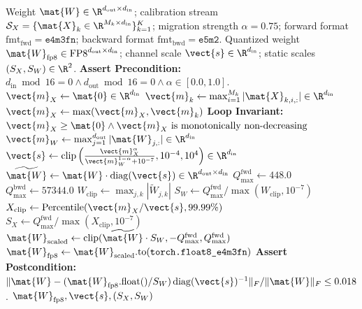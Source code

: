 \begin{algorithm}[H]
\caption[Outlier-Isolated Channel-Scaled FP8 Mixed-Precision Quantization]{Outlier-Isolated Channel-Scaled FP8 Mixed-Precision Quantization}
\label{alg:fp8_mixed_precision_quant}
\begin{algorithmic}[1]
\REQUIRE Weight $\mat{W} \in \R^{d_{\text{out}} \times d_{\text{in}}}$; calibration stream $\mathcal{S}_X = \{\mat{X}_k \in \R^{M_k \times d_{\text{in}}}\}_{k=1}^K$; migration strength $\alpha = 0.75$; forward format $\text{fmt}_{\text{fwd}} = \texttt{e4m3fn}$; backward format $\text{fmt}_{\text{bwd}} = \texttt{e5m2}$.
\ENSURE Quantized weight $\mat{W}_{\text{fp8}} \in \text{FP8}^{d_{\text{out}} \times d_{\text{in}}}$; channel scale $\vect{s} \in \R^{d_{\text{in}}}$; static scales $(S_X, S_W) \in \R^2$.
\STATE \textbf{Assert Precondition:} $d_{\text{in}} \bmod 16 = 0 \land d_{\text{out}} \bmod 16 = 0 \land \alpha \in [0.0, 1.0]$.
\STATE {}
\STATE $\vect{m}_X \leftarrow \mat{0} \in \R^{d_{\text{in}}}$
    \STATE $\vect{m}_k \leftarrow \max_{i=1}^{M_k} |\mat{X}_{k, i, :}| \in \R^{d_{\text{in}}}$ 
    \STATE $\vect{m}_X \leftarrow \max(\vect{m}_X, \vect{m}_k)$
    \STATE \textbf{Loop Invariant:} $\vect{m}_X \ge \mat{0} \land \vect{m}_X \text{ is monotonically non-decreasing}$
\ENDFOR
\STATE {}
\STATE $\vect{m}_W \leftarrow \max_{j=1}^{d_{\text{out}}} |\mat{W}_{j, :}| \in \R^{d_{\text{in}}}$ 
\STATE $\vect{s} \leftarrow \operatorname{clip}\left(\frac{\vect{m}_X^\alpha}{\vect{m}_W^{1 - \alpha} + 10^{-7}}, 10^{-4}, 10^4\right) \in \R^{d_{\text{in}}}$
\STATE {}
\STATE $\widetilde{\mat{W}} \leftarrow \mat{W} \cdot \operatorname{diag}(\vect{s}) \in \R^{d_{\text{out}} \times d_{\text{in}}}$ 
\STATE {}
\STATE $Q_{\max}^{\text{fwd}} \leftarrow 448.0$ 
\STATE $Q_{\max}^{\text{bwd}} \leftarrow 57344.0$ 
\STATE $W_{\text{clip}} \leftarrow \max_{j, k} |\widetilde{W}_{j, k}|$
\STATE $S_W \leftarrow Q_{\max}^{\text{fwd}} / \max(W_{\text{clip}}, 10^{-7})$ 
\STATE $X_{\text{clip}} \leftarrow \text{Percentile}(\vect{m}_X / \vect{s}, 99.99\%)$
\STATE $S_X \leftarrow Q_{\max}^{\text{fwd}} / \max(X_{\text{clip}}, 10^{-7})$ 
\STATE {}
\STATE $\mat{W}_{\text{scaled}} \leftarrow \operatorname{clip}(\widetilde{\mat{W}} \cdot S_W, -Q_{\max}^{\text{fwd}}, Q_{\max}^{\text{fwd}})$
\STATE $\mat{W}_{\text{fp8}} \leftarrow \mat{W}_{\text{scaled}}.\text{to}(\texttt{torch.float8\_e4m3fn})$
\STATE \textbf{Assert Postcondition:} $\|\mat{W} - (\mat{W}_{\text{fp8}}.\text{float}() / S_W) \operatorname{diag}(\vect{s})^{-1}\|_F / \|\mat{W}\|_F \le 0.018$.
\RETURN $\mat{W}_{\text{fp8}}, \vect{s}, (S_X, S_W)$
\end{algorithmic}
\end{algorithm}

